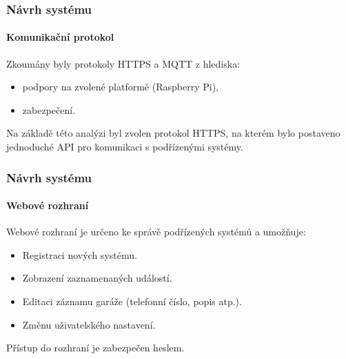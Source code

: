 \documentclass{beamer}
\begin{document}
  \begin{frame}
    \frametitle{Návrh systému}
    \framesubtitle{Komunikační protokol}

    Zkoumány byly protokoly HTTPS a MQTT z hlediska: 

    \begin{itemize}
      \item podpory na zvolené platformě (Raspberry Pi),
      \item zabezpečení. %
    \end{itemize}

    Na základě této analýzi byl zvolen protokol HTTPS, na kterém bylo postaveno jednoduché API pro komunikaci s podřízenými systémy.


  \end{frame}

  \begin{frame}
    \frametitle{Návrh systému}
    \framesubtitle{Webové rozhraní}

    Webové rozhraní je určeno ke správě podřízených systémů a umožňuje:

    \begin{itemize}
      \item Registraci nových systému.
      \item Zobrazení zaznamenaných událostí.
      \item Editaci záznamu garáže (telefonní číslo, popis atp.).
      \item Změnu uživatelského nastavení.
    \end{itemize}

    Přístup do rozhraní je zabezpečen heslem. %
    
  \end{frame}
\end{document}
